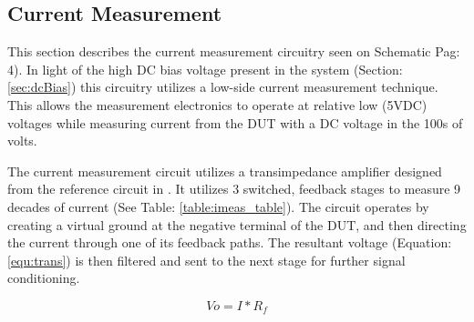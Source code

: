 \subsection{Current Measurement}
\label{sec:iMeas}

This section describes the current measurement circuitry seen on Schematic Pag: 4). In light of the high DC bias voltage present in the system (Section: \ref{sec:dcBias}) this circuitry utilizes a low-side current measurement technique. This allows the measurement electronics to operate at relative low (5VDC) voltages while measuring current from the DUT with a DC voltage in the 100s of volts.



The current measurement circuit utilizes a transimpedance amplifier designed from the reference circuit in \cite{steve_thesis}. It utilizes 3 switched, feedback stages to measure 9 decades of current (See Table: \ref{table:imeas_table}). The circuit operates by creating a virtual ground at the negative terminal of the DUT, and then directing the current through one of its feedback paths. The resultant voltage (Equation: \eqref{equ:trans}) is then filtered and sent to the next stage for further signal conditioning.

\begin{equation}
\label{equ:trans}
Vo = I*R_f
\end{equation}

